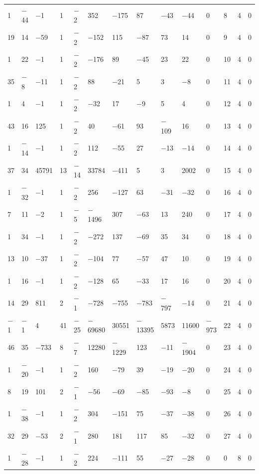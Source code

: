 \documentclass[pdftex]{sigma}
\numberwithin{equation}{section}
\theoremstyle{definition}
\numberwithin{table}{section}
\begin{document}
{\begin{paracol}{3}
\begin{supertabular}{|w{c}{.32cm}w{c}{.32cm}w{c}{.32cm}@{\hspace{.5cm}}w{c}{.2cm}w{c}{.2cm}|@{\hspace{\tabcolsep}}HHHHHHw{c}{.17cm}w{c}{.17cm}w{c}{.17cm}|}
			1 & $-$44 & $-$1 & 1 & $-$2 & 352 & $-$175 & 87 & $-$43 & $-$44 & 0 & 8 & 4 & 0 \\
			19 & 14 & $-$59 & 1 & $-$2 & $-$152 & 115 & $-$87 & 73 & 14 & 0 & 9 & 4 & 0 \\
			1 & 22 & $-$1 & 1 & $-$2 & $-$176 & 89 & $-$45 & 23 & 22 & 0 & 10 & 4 & 0 \\
			35 & $-$8 & $-$11 & 1 & $-$2 & 88 & $-$21 & 5 & 3 & $-$8 & 0 & 11 & 4 & 0 \\
			1 & 4 & $-$1 & 1 & $-$2 & $-$32 & 17 & $-$9 & 5 & 4 & 0 & 12 & 4 & 0 \\
			43 & 16 & 125 & 1 & $-$2 & 40 & $-$61 & 93 & $-$109 & 16 & 0 & 13 & 4 & 0 \\
			1 & $-$14 & $-$1 & 1 & $-$2 & 112 & $-$55 & 27 & $-$13 & $-$14 & 0 & 14 & 4 & 0 \\
			37 & 34 & 45791 & 13 & $-$14 & 33784 & $-$411 & 5 & 3 & 2002 & 0 & 15 & 4 & 0 \\
			1 & $-$32 & $-$1 & 1 & $-$2 & 256 & $-$127 & 63 & $-$31 & $-$32 & 0 & 16 & 4 & 0 \\
			7 & 11 & $-$2 & 1 & $-$5 & $-$1496 & 307 & $-$63 & 13 & 240 & 0 & 17 & 4 & 0 \\
			1 & 34 & $-$1 & 1 & $-$2 & $-$272 & 137 & $-$69 & 35 & 34 & 0 & 18 & 4 & 0 \\
			13 & 10 & $-$37 & 1 & $-$2 & $-$104 & 77 & $-$57 & 47 & 10 & 0 & 19 & 4 & 0 \\
			1 & 16 & $-$1 & 1 & $-$2 & $-$128 & 65 & $-$33 & 17 & 16 & 0 & 20 & 4 & 0 \\
			14 & 29 & 811 & 2 & $-$1 & $-$728 & $-$755 & $-$783 & $-$797 & $-$14 & 0 & 21 & 4 & 0 \\
			$-$1 & $-$1 & 4 & 41 & $-$25 & $-$69680 & 30551 & $-$13395 & 5873 & 11600 & $-$973 & 22 & 4 & 0 \\
			46 & 35 & $-$733 & 8 & $-$7 & 12280 & $-$1229 & 123 & $-$11 & $-$1904 & 0 & 23 & 4 & 0 \\
			1 & $-$20 & $-$1 & 1 & $-$2 & 160 & $-$79 & 39 & $-$19 & $-$20 & 0 & 24 & 4 & 0 \\
			8 & 19 & 101 & 2 & $-$1 & $-$56 & $-$69 & $-$85 & $-$93 & $-$8 & 0 & 25 & 4 & 0 \\
			1 & $-$38 & $-$1 & 1 & $-$2 & 304 & $-$151 & 75 & $-$37 & $-$38 & 0 & 26 & 4 & 0 \\
			32 & 29 & $-$53 & 2 & $-$1 & 280 & 181 & 117 & 85 & $-$32 & 0 & 27 & 4 & 0 \\
			1 & $-$28 & $-$1 & 1 & $-$2 & 224 & $-$111 & 55 & $-$27 & $-$28 & 0 & 0 & 8 & 0 \\

\end{supertabular}
\end{paracol}}
\end{document}
